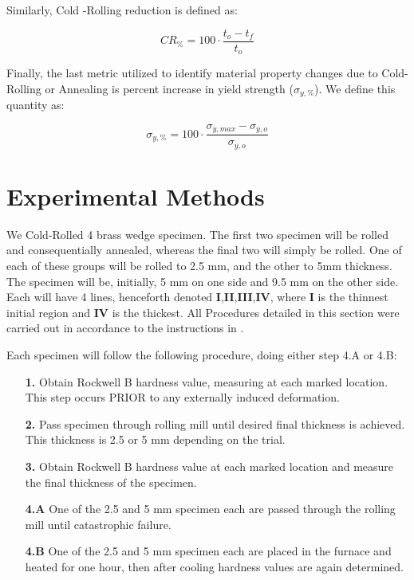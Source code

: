 \documentclass{article}
\begin{document}
Similarly, Cold -Rolling reduction is defined as:

\begin{equation}
    CR_{\%} = 100 \cdot \frac{t_o - t_f}{t_o}
    \label{CRdef}
\end{equation}

Finally, the last metric utilized to identify material property changes due to Cold-Rolling or Annealing is percent increase in yield strength ($\sigma_{y,\%}$). We define this quantity as:

\begin{equation}
    \sigma_{y,\%} = 100 \cdot \frac{\sigma_{y,max} - \sigma_{y,o}}{\sigma_{y,o}} 
    \label{percentyield}
\end{equation}

\section{Experimental Methods}

We Cold-Rolled 4 brass wedge specimen. The first two specimen will be rolled and consequentially annealed, whereas the final two will simply be rolled. One of each of these groups will be rolled to 2.5 mm, and the other to 5mm thickness. The specimen will be, initially, 5 mm on one side and 9.5 mm on the other side. Each will have 4 lines, henceforth denoted \textbf{I},\textbf{II},\textbf{III},\textbf{IV}, where \textbf{I} is the thinnest initial region and \textbf{IV} is the thickest. All Procedures  detailed in this section were carried out in accordance to the instructions in \cite{manual}.

Each specimen will follow the following procedure, doing either step 4.A or 4.B:
\begin{itemize}[leftmargin=.75in]
    \item[\textbf{1.}] Obtain Rockwell B hardness value, measuring at each marked location. This step occurs PRIOR to any externally induced deformation.
    \item[\textbf{2.}] Pass specimen through rolling mill until desired final thickness is achieved. This thickness is 2.5 or 5 mm depending on the trial. 
    \item[\textbf{3.}] Obtain Rockwell B hardness value at each marked location and measure the final thickness of the specimen.
    \item[\textbf{4.A}] One of the 2.5 and 5 mm specimen each are passed through the rolling mill until catastrophic failure. 
    \item[\textbf{4.B}] One of the 2.5 and 5 mm specimen each are placed in the furnace and heated for one hour, then after cooling hardness values are again determined.
\end{itemize}
\end{document}

